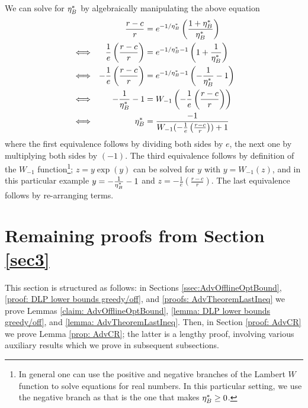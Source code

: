 \begin{enumerate}
    We can solve for $\eta^*_B$ by algebraically manipulating the above equation
    \begin{align*}
    & & \frac{r-c}{r} &= e^{-1/\eta^*_B}\left(\frac{1+\eta^*_B}{\eta^*_B}\right) \\
    &\Longleftrightarrow & \frac{1}{e} \left(\frac{r-c}{r}\right) &= e^{-1/\eta^*_B - 1}\left(1 + \frac{1}{\eta^*_B}\right) \\
    &\Longleftrightarrow & -\frac{1}{e} \left(\frac{r-c}{r}\right) &= e^{-1/\eta^*_B - 1}\left(-\frac{1}{\eta^*_B} - 1\right) \\
    &\Longleftrightarrow & -\frac{1}{\eta^*_B} - 1 &= W_{-1}\left( - \frac{1}{e} \left( \frac{r-c}{r} \right) \right) \\
    &\Longleftrightarrow & \eta^*_B &= \frac{-1}{W_{-1}(-\frac{1}{e} \left( \frac{r-c}{r} \right))+1}
\end{align*}
where the first equivalence follows by dividing both sides by $e$, the next one by multiplying both sides by $(-1)$. The third equivalence follows by definition of the $W_{-1}$ function\footnote{In general one can use the positive and negative branches of the Lambert $W$ function to solve equations for real numbers. In this particular setting, we use the negative branch as that is the one that makes $\eta^*_B \geq 0$.}; $z = y \exp(y)$ can be solved for $y$ with $y = W_{-1}(z)$, and in this particular example $y = -\frac{1}{\eta^*_B} - 1$ and $z = -\frac{1}{e} \left( \frac{r-c}{r} \right)$. The last equivalence follows by re-arranging terms.
\end{enumerate}

\section{Remaining proofs from Section \ref{sec3}}

This section is structured as follows: in Sections \ref{ssec:AdvOfflineOptBound}, \ref{proof: DLP lower bounds greedy/off}, and \ref{proofs: AdvTheoremLastIneq} we prove Lemmas \ref{claim: AdvOfflineOptBound}, \ref{lemma: DLP lower bounds greedy/off}, and \ref{lemma: AdvTheoremLastIneq}. Then, in  Section \ref{proof: AdvCR} we prove Lemma \ref{prop: AdvCR}; the latter is a lengthy proof, involving various auxiliary results which we prove in subsequent subsections.

